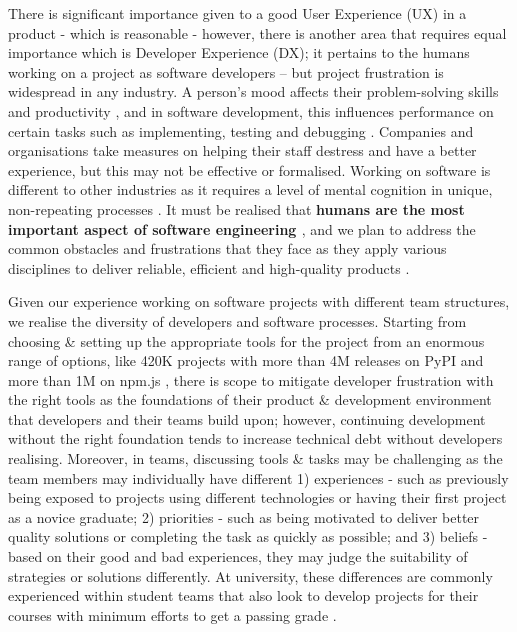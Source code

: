 \documentclass{prrcs}
\begin{document}

There is significant importance given to a good User Experience (UX) in a product - which is reasonable - however, there is another area that requires equal importance which is Developer Experience (DX); it pertains to the humans working on a project as software developers -- but project frustration is widespread in any industry. A person's mood affects their problem-solving skills and productivity \cite{amabileProgressPrincipleUsing2011,graziotinFeelingsMatterCorrelation2015,meyerSoftwareDevelopersPerceptions2014,mullerStuckFrustratedFlow2015}, and in software development, this influences performance on certain tasks such as implementing, testing and debugging \cite{khanMoodsAffectProgrammers2011}. Companies and organisations take measures on helping their staff destress and have a better experience, but this may not be effective or formalised. Working on software is different to other industries as it requires a level of mental cognition in unique, non-repeating processes \cite{trendowiczChapterFactorsInfluencing2009,abdel-hamidSlipperyPathProductivity1996,briand2002software,kemererEmpiricalValidationSoftware1987}. It must be realised that \textbf{humans are the most important aspect of software engineering \cite{martinAgileSoftwareDevelopment2003}}, and we plan to address the common obstacles and frustrations that they face as they apply various disciplines to deliver reliable, efficient and high-quality products \cite{sommervilleSoftwareEngineering1992}.

Given our experience working on software projects with different team structures, we realise the diversity of developers and software processes. Starting from choosing \& setting up the appropriate tools for the project from an enormous range of options, like 420K projects with more than 4M releases on PyPI \cite{PyPIPythonPackagea} and more than 1M on npm.js \cite{NpmBlogArchive}, there is scope to mitigate developer frustration with the right tools as the foundations of their product \& development environment that developers and their teams build upon; however, continuing development without the right foundation tends to increase technical debt without developers realising. Moreover, in teams, discussing tools \& tasks may be challenging as the team members may individually have different 1) experiences - such as previously being exposed to projects using different technologies or having their first project as a novice graduate; 2) priorities - such as being motivated to deliver better quality solutions or completing the task as quickly as possible; and 3) beliefs - based on their good and bad experiences, they may judge the suitability of strategies or solutions differently. At university, these differences are commonly experienced within student teams \cite{waiteStudentCultureVs2004} that also look to develop projects for their courses with minimum efforts to get a passing grade \cite{marzoloExtremeDevelopmentMeans2021}.
\end{document}
